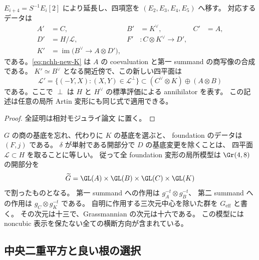 \begin{lemma}[二項移動の有限線型代数]\label{lem:nchh-gale}
$E_{i+4}=S^{-1}E_i[2]$ により延長し、四項窓を
$(E_2,E_3,E_4,E_5)$ へ移す。
対応するデータは
\begin{align}
A'&=C,& B'&=K^{\vee},& C'&=A,\label{eq:nchh-new-small}\\
D'&=H/\mathscr L,&
F'&:C\otimes K^{\vee}\longrightarrow D',\label{eq:nchh-new-D}\\
K'&=\operatorname{im}\bigl(B^{\vee}\longrightarrow A\otimes D'\bigr),\label{eq:nchh-new-K}
\end{align}
である。\eqref{eq:nchh-new-K} は $A$ の coevaluation と第一 summand の商写像の合成である。
$K'\simeq B^{\vee}$ となる開近傍で、この新しい四平面は
\begin{equation}\label{eq:nchh-gale}
\mathscr L'=\{(-Y,X):(X,Y)\in\mathscr L^{\perp}\}
 \subset(C^{\vee}\otimes K)\oplus(A\otimes B)
\end{equation}
である。ここで $\perp$ は $H$ と $H^{\vee}$ の標準評価による annihilator を表す。
この記述は任意の局所 Artin 変形にも同じ式で適用できる。
\end{lemma}

\begin{proof}
全証明は相対モジュライ論文 \cite[\texttt{noncubic_hh_roots}]{QuadricModuli2026} に置く。
\end{proof}

\begin{remark}[全変形空間を使うこと]
$G$ の商の基底を忘れ、代わりに $K$ の基底を選ぶと、
foundation のデータは $(F,j)$ である。
$\delta$ が単射である開部分で $D$ の基底変更を除くことは、
四平面 $\mathscr L\subset H$ を取ることに等しい。
従って全 foundation 変形の局所模型は
$\Gr(4,8)$ の開部分を
\[
\widetilde G=\GL(A)\times\GL(B)\times\GL(C)\times\GL(K)
\]
で割ったものとなる。
第一 summand への作用は $g_A^{-t}\otimes g_B^{-t}$、
第二 summand への作用は $g_C\otimes g_K^{-t}$ である。
自明に作用する三次元中心を除いた群を $G_{\mathrm{eff}}$ と書く。
その次元は十三で、Grassmannian の次元は十六である。
この模型には noncubic 表示を保たない全ての横断方向が含まれている。
\end{remark}

\subsection{中央二重平方と良い根の選択}

